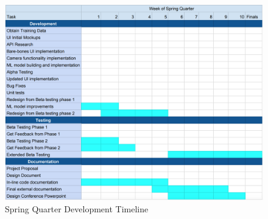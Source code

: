 \begin{figure}[!h]
	\centering
	\includegraphics[width=1\textwidth]{timeline3}
	\caption{Spring Quarter Development Timeline}
	\label{fig:timeline3}
\end{figure}